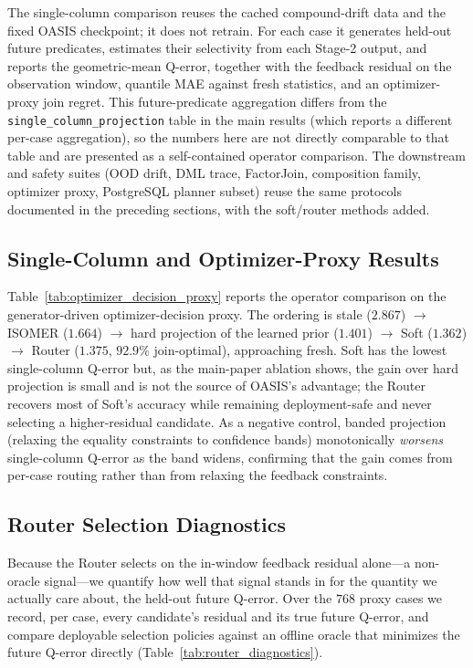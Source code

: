 \documentclass[11pt]{article}
\begin{document}
The single-column comparison reuses the cached compound-drift data and the fixed
OASIS checkpoint; it does not retrain. For each case it generates held-out future
predicates, estimates their selectivity from each Stage-2 output, and reports the
geometric-mean Q-error, together with the feedback residual on the observation
window, quantile MAE against fresh statistics, and an optimizer-proxy join
regret. This future-predicate aggregation differs from the
\texttt{single\_column\_projection} table in the main results (which reports a
different per-case aggregation), so the numbers here are not directly comparable
to that table and are presented as a self-contained operator comparison. The
downstream and safety suites (OOD drift, DML trace, FactorJoin, composition
family, optimizer proxy, PostgreSQL planner subset) reuse the same protocols
documented in the preceding sections, with the soft/router methods added.

\subsection{Single-Column and Optimizer-Proxy Results}



Table~\ref{tab:optimizer_decision_proxy} reports the operator comparison on the
generator-driven optimizer-decision proxy. The ordering is
stale ($2.867$) $\to$ ISOMER ($1.664$) $\to$ hard projection of the learned prior
($1.401$) $\to$ Soft ($1.362$) $\to$ Router ($1.375$, $92.9\%$ join-optimal),
approaching fresh. Soft has the lowest single-column Q-error but, as the main-paper
ablation shows, the gain over hard projection is small and is not the source of OASIS's
advantage; the Router recovers most of Soft's accuracy while remaining deployment-safe and
never selecting a higher-residual candidate. As a negative control, banded projection
(relaxing the equality constraints to confidence bands) monotonically \emph{worsens}
single-column Q-error as the band widens, confirming that the gain comes from per-case
routing rather than from relaxing the feedback constraints.

\subsection{Router Selection Diagnostics}
\label{sec:router-diagnostics}

Because the Router selects on the in-window feedback residual alone---a non-oracle
signal---we quantify how well that signal stands in for the quantity we actually care
about, the held-out future Q-error. Over the $768$ proxy cases we record, per case, every
candidate's residual and its true future Q-error, and compare deployable selection
policies against an offline oracle that minimizes the future Q-error directly
(Table~\ref{tab:router_diagnostics}).
\end{document}
